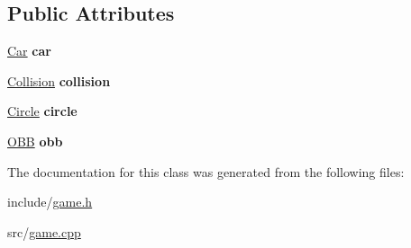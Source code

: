 \subsection*{Public Attributes}
\begin{DoxyCompactItemize}
\item 
\hypertarget{class_game_a6ffa56dab840e2653349ede6ce614140}{}\hyperlink{class_car}{Car} {\bfseries car}\label{class_game_a6ffa56dab840e2653349ede6ce614140}

\item 
\hypertarget{class_game_a2e35256773d260c4825865923e8ee87e}{}\hyperlink{class_collision}{Collision} {\bfseries collision}\label{class_game_a2e35256773d260c4825865923e8ee87e}

\item 
\hypertarget{class_game_a09585dbc811827888cf39f371b57c390}{}\hyperlink{class_circle}{Circle} {\bfseries circle}\label{class_game_a09585dbc811827888cf39f371b57c390}

\item 
\hypertarget{class_game_a5bff2d8a5b318663bff5243c1c3dfacb}{}\hyperlink{class_o_b_b}{O\+B\+B} {\bfseries obb}\label{class_game_a5bff2d8a5b318663bff5243c1c3dfacb}

\end{DoxyCompactItemize}


The documentation for this class was generated from the following files\+:\begin{DoxyCompactItemize}
\item 
include/\hyperlink{game_8h}{game.\+h}\item 
src/\hyperlink{game_8cpp}{game.\+cpp}\end{DoxyCompactItemize}
